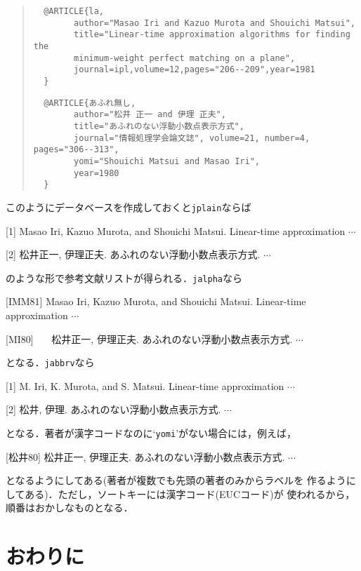 {\baselineskip=11pt
\begin{quote}
\begin{verbatim}
  @ARTICLE{la,
        author="Masao Iri and Kazuo Murota and Shouichi Matsui",
        title="Linear-time approximation algorithms for finding the
        minimum-weight perfect matching on a plane",
        journal=ipl,volume=12,pages="206--209",year=1981
  }
\end{verbatim}
\newpage
\begin{verbatim}
  @ARTICLE{あふれ無し,
        author="松井 正一 and 伊理 正夫",
        title="あふれのない浮動小数点表示方式",
        journal="情報処理学会論文誌", volume=21, number=4, pages="306--313",
        yomi="Shouichi Matsui and Masao Iri",
        year=1980
  }
\end{verbatim}
\end{quote}
}

このようにデータベースを作成しておくと{\tt jplain}ならば

\vskip 1.5mm
\hskip1cm
[1] Masao Iri, Kazuo Murota, and Shouichi Matsui. 
Linear-time approximation $\cdots$

\hskip1cm
[2] 松井正一, 伊理正夫. あふれのない浮動小数点表示方式. $\cdots$
\vskip 1.5mm

\noindent のような形で参考文献リストが得られる．{\tt jalpha}なら

\vskip 1.5mm
\hskip1cm
[IMM81] Masao Iri, Kazuo Murota, and Shouichi Matsui. Linear-time approximation
 $\cdots$

\hskip1cm
[MI80]~~~ 松井正一, 伊理正夫. あふれのない浮動小数点表示方式. $\cdots$
\vskip 1.5mm

\noindent となる．{\tt jabbrv}なら

\vskip 1.5mm
\hskip1cm
[1] M. Iri, K. Murota, and S. Matsui. Linear-time approximation
 $\cdots$

\hskip1cm
[2] 松井, 伊理. あふれのない浮動小数点表示方式. $\cdots$
\vskip 1.5mm

\noindent となる．著者が漢字コードなのに`{\tt yomi}'がない場合には，例えば，

\vskip 1.5mm
\hskip1cm
[松井80] 松井正一, 伊理正夫. あふれのない浮動小数点表示方式. $\cdots$
\vskip 1.5mm

\noindent となるようにしてある(著者が複数でも先頭の著者のみからラベルを
作るようにしてある)．ただし，ソートキーには漢字コード(EUCコード)が
使われるから，順番はおかしなものとなる．


\section{おわりに}

